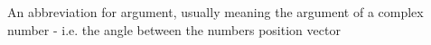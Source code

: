 An abbreviation for argument, usually meaning the argument of a 
complex number - i.e. the angle between the numbers position vector